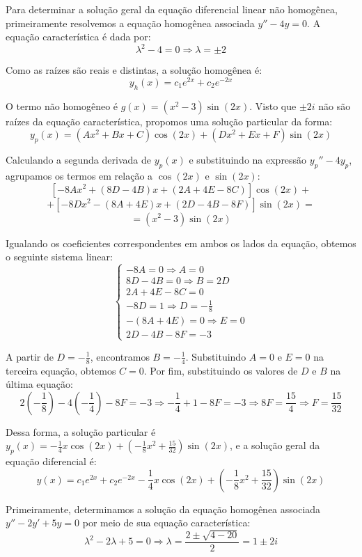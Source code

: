 \documentclass[oneside,12pt,a4paper]{report}
\begin{document}
\begin{resolucao}
    \itemresolucao Para determinar a solução geral da equação diferencial linear não homogênea, primeiramente resolvemos a equação homogênea associada $y'' - 4y = 0$. A equação característica é dada por:
    \[\lambda^2 - 4 = 0 \Rightarrow \lambda = \pm 2\]

    Como as raízes são reais e distintas, a solução homogênea é:
    \[y_h(x) = c_1 e^{2x} + c_2 e^{-2x}\]

    O termo não homogêneo é $g(x) = (x^2 - 3)\sin(2x)$. Visto que $\pm 2i$ não são raízes da equação característica, propomos uma solução particular da forma:
    \[y_p(x) = (Ax^2 + Bx + C)\cos(2x) + (Dx^2 + Ex + F)\sin(2x)\]

    Calculando a segunda derivada de $y_p(x)$ e substituindo na expressão $y_p'' - 4y_p$, agrupamos os termos em relação a $\cos(2x)$ e $\sin(2x)$:
    \[[ -8Ax^2 + (8D - 4B)x + (2A + 4E - 8C) ]\cos(2x) +\] 
    \[+[ -8Dx^2 - (8A + 4E)x + (2D - 4B - 8F)]\sin(2x) =\]
    \[=(x^2 - 3)\sin(2x)\]

    Igualando os coeficientes correspondentes em ambos os lados da equação, obtemos o seguinte sistema linear:
    \[\begin{cases}
        -8A = 0 \Rightarrow A = 0 \\
        8D - 4B = 0 \Rightarrow B = 2D \\
        2A + 4E - 8C = 0 \\
        -8D = 1 \Rightarrow D = -\frac{1}{8} \\
        -(8A + 4E) = 0 \Rightarrow E = 0 \\
        2D - 4B - 8F = -3
    \end{cases}\]

    A partir de $D = -\frac{1}{8}$, encontramos $B = -\frac{1}{4}$. Substituindo $A=0$ e $E=0$ na terceira equação, obtemos $C = 0$. Por fim, substituindo os valores de $D$ e $B$ na última equação:
    \[2\left(-\frac{1}{8}\right) - 4\left(-\frac{1}{4}\right) - 8F = -3 \Rightarrow -\frac{1}{4} + 1 - 8F = -3 \Rightarrow 8F = \frac{15}{4} \Rightarrow F = \frac{15}{32}\]

    Dessa forma, a solução particular é $\boxed{y_p(x) = -\frac{1}{4}x\cos(2x) + \left(-\frac{1}{8}x^2 + \frac{15}{32}\right)\sin(2x)}$, e a solução geral da equação diferencial é:
    \[\boxed{y(x) = c_1 e^{2x} + c_2 e^{-2x} - \frac{1}{4}x\cos(2x) + \left(-\frac{1}{8}x^2 + \frac{15}{32}\right)\sin(2x)}\]

    \itemresolucao Primeiramente, determinamos a solução da equação homogênea associada $y'' - 2y' + 5y = 0$ por meio de sua equação característica:
    \[\lambda^2 - 2\lambda + 5 = 0 \Rightarrow \lambda = \frac{2 \pm \sqrt{4 - 20}}{2} = 1 \pm 2i\]


\end{resolucao}
\end{document}

